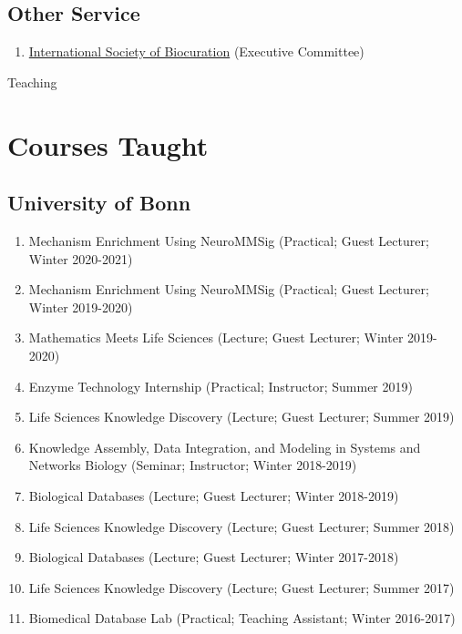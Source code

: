 \documentclass[10pt,a4paper,sans]{moderncv} %
\begin{document}
    \subsection{Other Service}
    \begin{enumerate}
        \item \href{https://bioregistry.io/wikidata:Q23809291?provider=scholia}{International Society of Biocuration} (Executive Committee)
    \end{enumerate}

\pagebreak
{\huge Teaching}

    \section{Courses Taught}
        \subsection{University of Bonn}
        \begin{enumerate}
        \item     Mechanism Enrichment Using NeuroMMSig (Practical; Guest Lecturer; Winter 2020-2021)

        \item     Mechanism Enrichment Using NeuroMMSig (Practical; Guest Lecturer; Winter 2019-2020)

        \item     Mathematics Meets Life Sciences (Lecture; Guest Lecturer; Winter 2019-2020)

        \item     Enzyme Technology Internship (Practical; Instructor; Summer 2019)

        \item     Life Sciences Knowledge Discovery (Lecture; Guest Lecturer; Summer 2019)

        \item     Knowledge Assembly, Data Integration, and Modeling in Systems and Networks Biology (Seminar; Instructor; Winter 2018-2019)

        \item     Biological Databases (Lecture; Guest Lecturer; Winter 2018-2019)

        \item     Life Sciences Knowledge Discovery (Lecture; Guest Lecturer; Summer 2018)

        \item     Biological Databases (Lecture; Guest Lecturer; Winter 2017-2018)

        \item     Life Sciences Knowledge Discovery (Lecture; Guest Lecturer; Summer 2017)

        \item     Biomedical Database Lab (Practical; Teaching Assistant; Winter 2016-2017)

        \end{enumerate}
\end{document}
